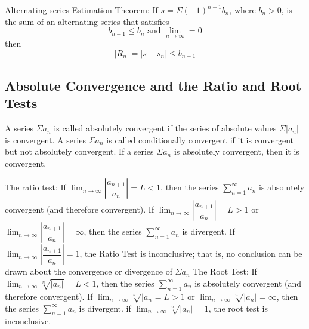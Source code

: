 \documentclass{article}
\begin{document}
        \begin{outline}
        \1 Alternating series Estimation Theorem: If \(s=\Sigma (-1)^{n-1}b_n\), where \(b_n>0\), is the sum of an alternating series that satisfies \[b_{n+1}\leq b_n\mbox{ and }\lim_{n\to\infty}=0\] then \[|R_n|=|s-s_n|\leq b_{n+1}\]
    \end{outline}
    \subsection{Absolute Convergence and the Ratio and Root Tests}
    \begin{outline}
        \1 A series \(\Sigma a_n\) is called absolutely convergent if the series of absolute values \(\Sigma|a_n|\) is convergent. 
        \1 A series \(\Sigma a_n\) is called conditionally convergent if it is convergent but not absolutely convergent. 
        \1 If a series \(\Sigma a_n\) is absolutely convergent, then it is convergent. 
    \end{outline}

\begin{outline}
    
        \1 The ratio test: 
            \2 If \(\lim_{n\to\infty}\left|\dfrac{a_{n+1}}{a_n}\right|=L<1\), then the series \(\sum^\infty_{n=1}a_n\) is absolutely convergent (and therefore convergent). 
            \2 If \(\lim_{n\to\infty}\left|\dfrac{a_{n+1}}{a_n}\right|=L>1\) or \(\lim_{n\to\infty}\left|\dfrac{a_{n+1}}{a_n}\right|=\infty\), then the series \(\sum^\infty_{n=1}a_n\) is divergent. 
            \2 If \(\lim_{n\to\infty}\left|\dfrac{a_{n+1}}{a_n}\right|=1\), the Ratio Test is inconclusive; that is, no conclusion can be drawn about the convergence or divergence of \(\Sigma a_n\)
        \1 The Root Test: 
            \2 If \(\lim_{n\to\infty}\sqrt[n]{|a_n|}=L<1\), then the series \(\sum^\infty_{n=1}a_n\) is absolutely convergent (and therefore convergent). 
            \2 If \(\lim_{n\to\infty}\sqrt[n]{|a_n}=L>1\) or \(\lim_{n\to\infty}\sqrt[n]{|a_n|}=\infty\), then the series \(\sum^\infty_{n=1}a_n\) is divergent. 
            \2 if \(\lim_{n\to\infty}\sqrt[n]{|a_n|}=1\), the root test is inconclusive. 
    
        \end{outline}
        
\end{document}

